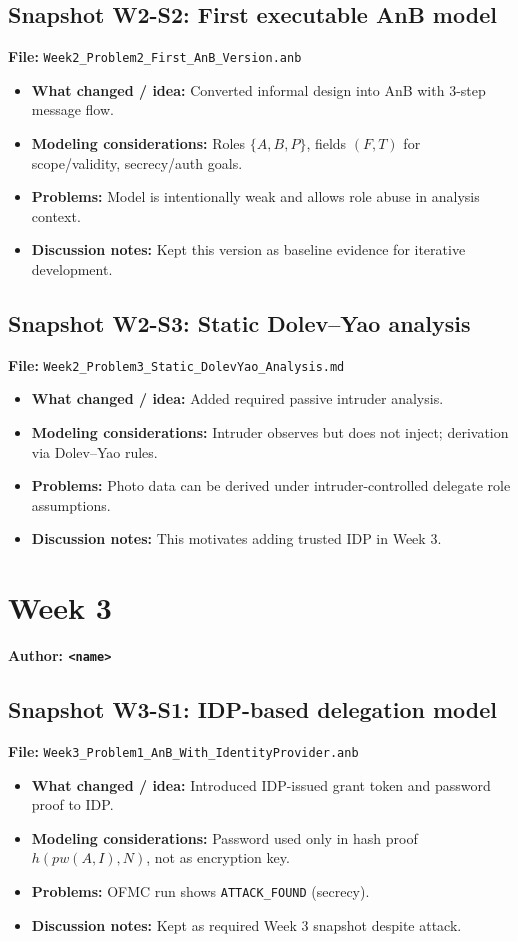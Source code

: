 \documentclass[11pt,a4paper]{article}
\begin{document}
\subsection*{Snapshot W2-S2: First executable AnB model}
\textbf{File:} \texttt{Week2\_Problem2\_First\_AnB\_Version.anb}
\begin{itemize}[leftmargin=1.2em]
  \item \textbf{What changed / idea:} Converted informal design into AnB with 3-step message flow.
  \item \textbf{Modeling considerations:} Roles $\{A,B,P\}$, fields $(F,T)$ for scope/validity, secrecy/auth goals.
  \item \textbf{Problems:} Model is intentionally weak and allows role abuse in analysis context.
  \item \textbf{Discussion notes:} Kept this version as baseline evidence for iterative development.
\end{itemize}

\subsection*{Snapshot W2-S3: Static Dolev--Yao analysis}
\textbf{File:} \texttt{Week2\_Problem3\_Static\_DolevYao\_Analysis.md}
\begin{itemize}[leftmargin=1.2em]
  \item \textbf{What changed / idea:} Added required passive intruder analysis.
  \item \textbf{Modeling considerations:} Intruder observes but does not inject; derivation via Dolev--Yao rules.
  \item \textbf{Problems:} Photo data can be derived under intruder-controlled delegate role assumptions.
  \item \textbf{Discussion notes:} This motivates adding trusted IDP in Week 3.
\end{itemize}

\section{Week 3}
\textbf{Author: \texttt{<name>}}

\subsection*{Snapshot W3-S1: IDP-based delegation model}
\textbf{File:} \texttt{Week3\_Problem1\_AnB\_With\_IdentityProvider.anb}
\begin{itemize}[leftmargin=1.2em]
  \item \textbf{What changed / idea:} Introduced IDP-issued grant token and password proof to IDP.
  \item \textbf{Modeling considerations:} Password used only in hash proof $h(pw(A,I),N)$, not as encryption key.
  \item \textbf{Problems:} OFMC run shows \texttt{ATTACK\_FOUND} (secrecy).
  \item \textbf{Discussion notes:} Kept as required Week 3 snapshot despite attack.
\end{itemize}
\end{document}
